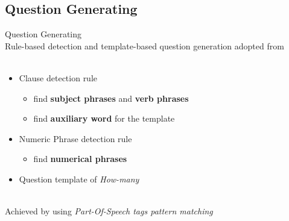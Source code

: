 \documentclass[11pt]{beamer}
\begin{document}
\subsection{Question Generating}
\begin{frame}{Question Generating}
    \\ \pause
    Rule-based detection and template-based question generation adopted from \cite{Das2016}\\
    ~\\
    \begin{itemize}
    \item Clause detection rule
    \begin{itemize}
        \item find \textbf{subject phrases} and \textbf{verb phrases}
        \item find \textbf{auxiliary word} for the template
    \end{itemize}
    \item Numeric Phrase detection rule
    \begin{itemize}
        \item find \textbf{numerical phrases}
    \end{itemize}
    \item Question template of \emph{How-many}
    \end{itemize}
    ~\\
    Achieved by using \emph{Part-Of-Speech tags pattern matching}
\end{frame}
\end{document}
